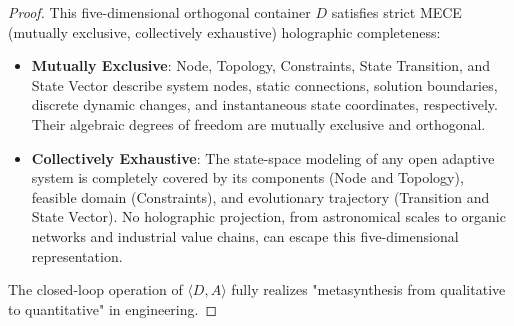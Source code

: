 \documentclass[11pt,a4paper]{article}
\begin{document}
\begin{proof}
This five-dimensional orthogonal container $D$ satisfies strict MECE (mutually exclusive, collectively exhaustive) holographic completeness:
\begin{itemize}
    \item \textbf{Mutually Exclusive}: Node, Topology, Constraints, State Transition, and State Vector describe system nodes, static connections, solution boundaries, discrete dynamic changes, and instantaneous state coordinates, respectively. Their algebraic degrees of freedom are mutually exclusive and orthogonal.
    \item \textbf{Collectively Exhaustive}: The state-space modeling of any open adaptive system is completely covered by its components (Node and Topology), feasible domain (Constraints), and evolutionary trajectory (Transition and State Vector). No holographic projection, from astronomical scales to organic networks and industrial value chains, can escape this five-dimensional representation.
\end{itemize}
The closed-loop operation of $\langle D, A \rangle$ fully realizes "metasynthesis from qualitative to quantitative" in engineering.
\end{proof}
\end{document}
